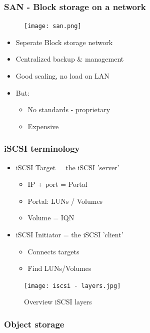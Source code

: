 \documentclass{article}
\begin{document}
\subsubsection{SAN - Block storage on a network}

\begin{figure}[H]
    \centering
    \texttt{[image: san.png]}
\end{figure}

\begin{itemize}
    \item Seperate Block storage network
    \item Centralized backup \& management
    \item Good scaling, no load on LAN
    \item But:
    \begin{itemize}
        \item No standards - proprietary
        \item Expensive
    \end{itemize}
\end{itemize}

\subsubsection{iSCSI terminology}

\begin{itemize}
    \item iSCSI Target = the iSCSI 'server'
    \begin{itemize}
        \item IP + port = Portal
        \item Portal: LUNs / Volumes
        \item Volume = IQN 
    \end{itemize}
    \item iSCSI Initiator = the iSCSI 'client'
    \begin{itemize}
        \item Connects targets
        \item Find LUNs/Volumes
    \end{itemize}
\end{itemize}

\begin{figure}[H]
    \centering
    \texttt{[image: iscsi - layers.jpg]}
    \caption{Overview iSCSI layers}
\end{figure}

\subsubsection{Object storage}
\end{document}
